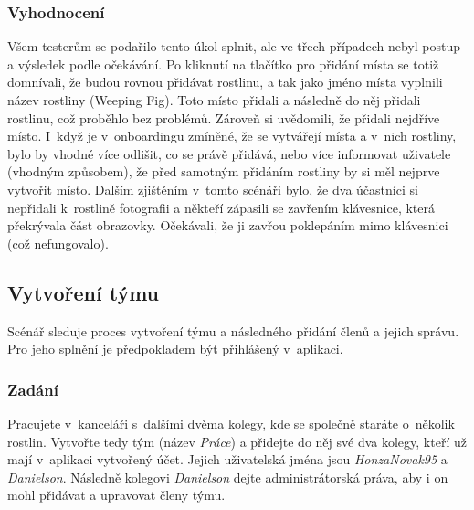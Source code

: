 \documentclass[thesis=M,czech]{FITthesis}[2019/12/23]
\begin{document}
\subsubsection*{Vyhodnocení}
Všem testerům se podařilo tento úkol splnit, ale ve třech případech nebyl postup a výsledek podle očekávání. Po kliknutí na tlačítko pro přidání místa se totiž domnívali, že budou rovnou přidávat rostlinu, a tak jako jméno místa vyplnili název rostliny (Weeping Fig). Toto místo přidali a následně do něj přidali rostlinu, což proběhlo bez problémů. Zároveň si uvědomili, že přidali nejdříve místo. I~když je v~onboardingu zmíněné, že se vytvářejí místa a v~nich rostliny, bylo by vhodné více odlišit, co se právě přidává, nebo více informovat uživatele (vhodným způsobem), že před samotným přidáním rostliny by si měl nejprve vytvořit místo. Dalším zjištěním v~tomto scénáři bylo, že dva účastníci si nepřidali k~rostlině fotografii a někteří zápasili se zavřením klávesnice, která překrývala část obrazovky. Očekávali, že ji zavřou poklepáním mimo klávesnici (což nefungovalo).

\subsection{Vytvoření týmu}
Scénář sleduje proces vytvoření týmu a následného přidání členů a jejich správu. Pro jeho splnění je předpokladem být přihlášený v~aplikaci.
\subsubsection*{Zadání}
Pracujete v~kanceláři s~dalšími dvěma kolegy, kde se společně staráte o~několik rostlin. Vytvořte tedy tým (název \textit{Práce}) a přidejte do něj své dva kolegy, kteří už mají v~aplikaci vytvořený účet. Jejich uživatelská jména jsou \textit{HonzaNovak95} a \textit{Danielson}. Následně kolegovi \textit{Danielson} dejte administrátorská práva, aby i on mohl přidávat a upravovat členy týmu.
\end{document}
